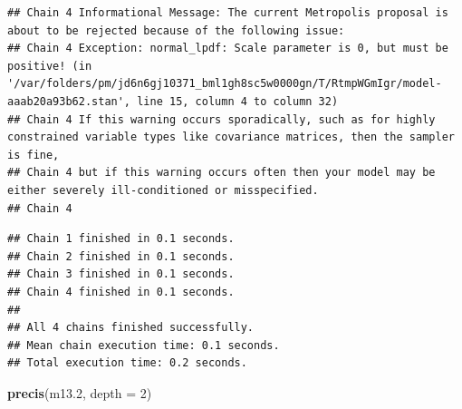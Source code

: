 \documentclass[
]{book}
\newenvironment{Shaded}{\begin{snugshade}}{\end{snugshade}}
\newcommand{\AttributeTok}[1]{\textcolor[rgb]{0.13,0.29,0.53}{#1}}
\newcommand{\DecValTok}[1]{\textcolor[rgb]{0.00,0.00,0.81}{#1}}
\newcommand{\FloatTok}[1]{\textcolor[rgb]{0.00,0.00,0.81}{#1}}
\newcommand{\FunctionTok}[1]{\textcolor[rgb]{0.13,0.29,0.53}{\textbf{#1}}}
\newcommand{\NormalTok}[1]{#1}
\begin{document}
\begin{verbatim}
## Chain 4 Informational Message: The current Metropolis proposal is about to be rejected because of the following issue:
## Chain 4 Exception: normal_lpdf: Scale parameter is 0, but must be positive! (in '/var/folders/pm/jd6n6gj10371_bml1gh8sc5w0000gn/T/RtmpWGmIgr/model-aaab20a93b62.stan', line 15, column 4 to column 32)
## Chain 4 If this warning occurs sporadically, such as for highly constrained variable types like covariance matrices, then the sampler is fine,
## Chain 4 but if this warning occurs often then your model may be either severely ill-conditioned or misspecified.
## Chain 4
\end{verbatim}

\begin{verbatim}
## Chain 1 finished in 0.1 seconds.
## Chain 2 finished in 0.1 seconds.
## Chain 3 finished in 0.1 seconds.
## Chain 4 finished in 0.1 seconds.
## 
## All 4 chains finished successfully.
## Mean chain execution time: 0.1 seconds.
## Total execution time: 0.2 seconds.
\end{verbatim}

\begin{Shaded}
\begin{Highlighting}[]
\FunctionTok{precis}\NormalTok{(m13}\FloatTok{.2}\NormalTok{, }\AttributeTok{depth =} \DecValTok{2}\NormalTok{)}
\end{Highlighting}
\end{Shaded}
\end{document}
